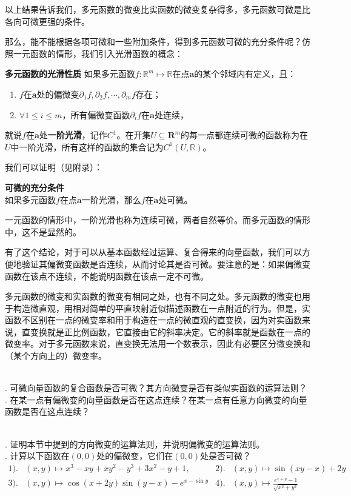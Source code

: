 \documentclass[12pt,UTF8]{ctexbook}
\begin{document}
以上结果告诉我们，多元函数的微变比实函数的微变复杂得多，多元函数可微是比各向可微更强的条件。

那么，能不能根据各项可微和一些附加条件，得到多元函数可微的充分条件呢？仿照一元函数的情形，我们引入光滑函数的概念：
\begin{df}{\textbf{多元函数的光滑性质}}
    如果多元函数$f: \mathbb{R}^m \mapsto \mathbb{R}$在点$\mathbf{a}$的某个邻域内有定义，且：
    \begin{enumerate}[label=\arabic*.]
    \item $f$在$\mathbf{a}$处的偏微变$\partial_1 f, \partial_2 f, \cdots, \partial_m f$存在；
    \item $\forall 1\leqslant i \leqslant m$，所有偏微变函数$\partial_i f$在$\mathbf{a}$处连续，
    \end{enumerate}
    就说$f$在$\mathbf{a}$处\textbf{一阶光滑}，记作$C^1$。在开集$U\subseteq\mathbf{R}^m$的每一点都连续可微的函数称为在$U$中一阶光滑，所有这样的函数的集合记为$C^1(U, \mathbb{R})$。
\end{df}
我们可以证明（见附录）：
\begin{tm}{\textbf{可微的充分条件}}\\
如果多元函数$f$在点$\mathbf{a}$一阶光滑，那么$f$在$\mathbf{a}$处可微。
\end{tm}
一元函数的情形中，一阶光滑也称为连续可微，两者自然等价。而多元函数的情形中，这不是显然的。

有了这个结论，对于可以从基本函数经过运算、复合得来的向量函数，我们可以方便地验证其偏微变函数是否连续，从而讨论其是否可微。要注意的是：如果偏微变函数在该点不连续，不能说明函数在该点一定不可微。

多元函数的微变和实函数的微变有相同之处，也有不同之处。多元函数的微变也用于构造微直观，用相对简单的平直映射近似描述函数在一点附近的行为。但是，实函数不区别在一点的微变率和用于构造在一点的微直观的直变换，因为对实函数来说，直变换就是正比例函数，它直接由它的斜率决定。它的斜率就是函数在一点的微变率。对于多元函数来说，直变换无法用一个数表示，因此有必要区分微变换和（某个方向上的）微变率。

\begin{sk}
    \mbox{} \\
    . 可微向量函数的复合函数是否可微？其方向微变是否有类似实函数的运算法则？\\
    . 在某一点有偏微变的向量函数是否在这点连续？在某一点有任意方向微变的向量函数是否在这点连续？
\end{sk}

\begin{xt}
    \mbox{} \\
    . 证明本节中提到的方向微变的运算法则，并说明偏微变的运算法则。\\
    . 
    计算以下函数在$(0,0)$处的偏微变，它们在$(0,0)$处是否可微？
    \begin{align*}
        1).& (x,y) \mapsto x^3 - xy + xy^2 - y^3 + 3x^2 - y + 1,  &2).& (x,y) \mapsto \sin{(xy - x)} + 2y \\
        3).& (x,y) \mapsto \cos{(x + 2y)}\sin{(y - x)}  - e^{x - \sin{y}}   & 4).& (x,y) \mapsto \displaystyle\frac{e^{x + y} - 1}{\sqrt{x^2 + y^2}}
    \end{align*}
\end{xt}
\end{document}
